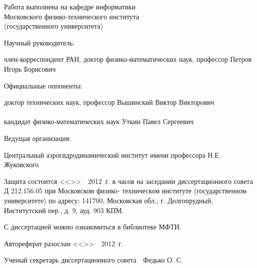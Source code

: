 \noindent
Работа выполнена на кафедре информатики\\
Московского физико-технического института\\
(государственного университета)\\

\vspace{4em}

\noindent
\begin{minipage}[t]{0.4\textwidth}
Научный руководитель:
\end{minipage}
\begin{minipage}[t]{0.6\textwidth}
член-корреспондент РАН, доктор физико-математических наук, профессор Петров Игорь Борисович
\end{minipage}

\vspace{4em}

\noindent
\begin{minipage}[t]{0.4\textwidth}
Официальные оппоненты:
\end{minipage}
\begin{minipage}[t]{0.6\textwidth}
доктор технических наук, профессор Вышинский Виктор Викторович\\
 \\
кандидат физико-математических наук Уткин Павел Сергеевич
\end{minipage}

\vspace{4em}

\noindent
\begin{minipage}[t]{0.4\textwidth}
Ведущая организация:
\end{minipage}
\begin{minipage}[t]{0.6\textwidth}
Центральный аэрогидродинамический институт имени профессора Н.Е. Жуковского
\end{minipage}

\vspace{8em}

\noindent
Защита состоится <<\underline{\hspace{10 mm}}>>\ \underline{\hspace{50 mm}}\ 2012~г. в \underline{\hspace{20 mm}} часов на заседании
диссертационного совета Д 212.156.05 при Московском физико-
техническом институте (государственном университете) по адресу:
141700, Московская обл., г. Долгопрудный, Институтский пер., д. 9, ауд.
903 КПМ.

\vspace{2em}

\noindent
С диссертацией можно ознакомиться в библиотеке МФТИ.

\vspace{2em}

\noindent
Автореферат разослан <<\underline{\hspace{10 mm}}>>\ \underline{\hspace{50 mm}}\ 2012~г.

\vspace{\fill}

\noindent
Ученый секретарь диссертационного совета\ \hspace{40 mm}\ Федько О. С.


